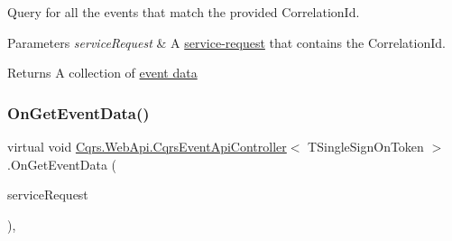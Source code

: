 Query for all the events that match the provided Correlation\+Id. 


\begin{DoxyParams}{Parameters}
{\em service\+Request} & A \hyperlink{}{service-\/request} that contains the Correlation\+Id.\\
\hline
\end{DoxyParams}
\begin{DoxyReturn}{Returns}
A collection of \hyperlink{}{event data}
\end{DoxyReturn}
\mbox{\label{classCqrs_1_1WebApi_1_1CqrsEventApiController_a705b40b973640de14f7b8b7b4c6eb1fe}} 
\subsubsection{\texorpdfstring{On\+Get\+Event\+Data()}{OnGetEventData()}}
{\footnotesize\ttfamily virtual void \hyperlink{classCqrs_1_1WebApi_1_1CqrsEventApiController}{Cqrs.\+Web\+Api.\+Cqrs\+Event\+Api\+Controller}$<$ T\+Single\+Sign\+On\+Token $>$.On\+Get\+Event\+Data (\begin{DoxyParamCaption}\item[{\hyperlink{interfaceCqrs_1_1Services_1_1IServiceRequestWithData}{I\+Service\+Request\+With\+Data}$<$ T\+Single\+Sign\+On\+Token, Guid $>$}]{service\+Request }\end{DoxyParamCaption})\hspace{0.3cm}{\ttfamily [protected]}, {\ttfamily [virtual]}}

\mbox{\label{classCqrs_1_1WebApi_1_1CqrsEventApiController_a9f0147c846a7fd7628d199ff268d178e}} 
